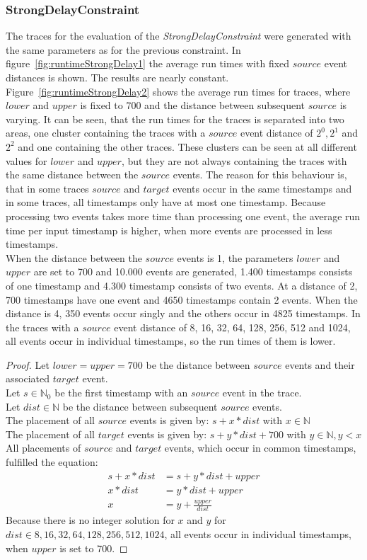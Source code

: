\subsubsection{StrongDelayConstraint}
	The traces for the evaluation of the \textit{StrongDelayConstraint} were generated with the same parameters as for the previous constraint. In figure~\ref{fig:runtimeStrongDelay1} the average run times with fixed $source$ event distances is shown. The results are nearly constant. Figure~\ref{fig:runtimeStrongDelay2} shows the average run times for traces, where $lower$ and $upper$ is fixed to 700 and the distance between subsequent $source$ is varying. It can be seen, that the run times for the traces is separated into two areas, one cluster containing the traces with a $source$ event distance of $2^0, 2^1$ and $2^2$ and one containing the other traces. These clusters can be seen at all different values for $lower$ and $upper$, but they are not always containing the traces with the same distance between the $source$ events. The reason for this behaviour is, that in some traces $source$ and $target$ events occur in the same timestamps and in some traces, all timestamps only have at most one timestamp. Because processing two events takes more time than processing one event, the average run time per input timestamp is higher, when more events are processed in less timestamps.\\
	When the distance between the $source$ events is 1, the parameters $lower$ and $upper$ are set to 700 and 10.000 events are generated, 1.400 timestamps consists of one timestamp and 4.300 timestamp consists of two events. At a distance of 2, 700 timestamps have one event and 4650 timestamps contain 2 events. When the distance is 4, 350 events occur singly and the others occur in 4825 timestamps. In the traces with a $source$ event distance of 8, 16, 32, 64, 128, 256, 512 and 1024, all events occur in individual timestamps, so the run times of them is lower.
	\begin{proof}
		Let $lower=upper=700$ be the distance between $source$ events and their associated $target$ event.\\
		Let $s\in\mathbb{N}_0$ be the first timestamp with an $source$ event in the trace.\\
		Let $dist\in\mathbb{N}$ be the distance between subsequent $source$ events.\\
		The placement of all $source$ events is given by: $s+x*dist$ with $x\in\mathbb N$\\
		The placement of all $target$ events is given by: $s+y*dist + 700$ with $y\in\mathbb N, y<x$\\
		All placements of $source$ and $target$ events, which occur in common timestamps, fulfilled the equation:\\
		\begin{align}
			s+x*dist&=s+y*dist+upper\\
			x*dist&=y*dist+upper\\
			x&= y + \frac{upper}{dist}
		\end{align}
		Because there is no integer solution for $x$ and $y$ for $dist\in{8,16,32,64,128,256,512,1024}$, all events occur in individual timestamps, when $upper$ is set to 700.
	\end{proof}
